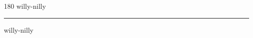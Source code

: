 
\begin{frame}
\begin{center}
\begin{turn}{180}
{\fontsize{2.5cm}{1em}\selectfont willy-nilly}
\end{turn}
\vspace{1em}\par  
\hrule
\vspace{1em}\par  
{\fontsize{2.5cm}{1em}\selectfont willy-nilly}
\end{center}
\end{frame}
